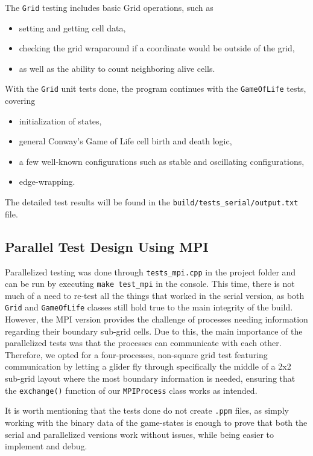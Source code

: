 \documentclass[11pt]{article}
\begin{document}
The \texttt{Grid} testing includes basic Grid operations, such as 
\begin{itemize}
    \item setting and getting cell data,
    \item checking the grid wraparound if a coordinate would be outside of the grid,
    \item as well as the ability to count neighboring alive cells.
\end{itemize}

With the \texttt{Grid} unit tests done, the program continues with the \texttt{GameOfLife} tests, covering
\begin{itemize}
    \item initialization of states,
    \item general Conway’s Game of Life cell birth and death logic,
    \item a few well-known configurations such as stable and oscillating configurations,
    \item edge-wrapping.
\end{itemize}

The detailed test results will be found in the \texttt{build/tests\_serial/output.txt} file.

\subsection{Parallel Test Design Using MPI}
Parallelized testing was done through \texttt{tests\_mpi.cpp} in the project folder and can be run by executing \texttt{make test\_mpi} in the console. This time, there is not much of a need to re-test all the things that worked in the serial version, as both \texttt{Grid} and \texttt{GameOfLife} classes still hold true to the main integrity of the build. However, the MPI version provides the challenge of processes needing information regarding their boundary sub-grid cells. Due to this, the main importance of the parallelized tests was that the processes can communicate with each other. Therefore, we opted for a four-processes, non-square grid test featuring communication by letting a glider fly through specifically the middle of a 2x2 sub-grid layout where the most boundary information is needed, ensuring that the \texttt{exchange()} function of our \texttt{MPIProcess} class works as intended. 

It is worth mentioning that the tests done do not create \texttt{.ppm} files, as simply working with the binary data of the game-states is enough to prove that both the serial and parallelized versions work without issues, while being easier to implement and debug.
\end{document}
